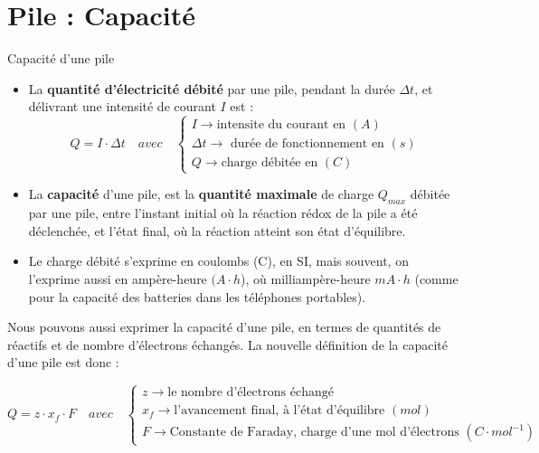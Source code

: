 \documentclass[11pt,a4paper]{article}
\begin{document}
\section{Pile : Capacité}

\begin{defn}{Capacité d'une pile}
\begin{itemize}
    \item La \textbf{quantité d'électricité débité} par une pile, pendant la durée $\Delta t$, et délivrant une intensité de courant $I$ est : 
    $$ Q = I\cdot \Delta t  \quad avec \quad \begin{cases}
    I \rightarrow  \text{intensite du courant en }(A) \\
    \Delta t \rightarrow \text{ durée de fonctionnement en }(s) \\ 
    Q \rightarrow  \text{charge débitée en }(C)
     \end{cases}$$
    \item La \textbf{capacité} d'une pile, est la \textbf{quantité maximale} de charge $Q_{max}$ débitée par une pile, entre l'instant initial où la réaction rédox de la pile a été déclenchée, et l'état final, où la réaction atteint son état d'équilibre. 
    \item Le charge débité s'exprime en coulombs (C), en SI, mais souvent, on l'exprime aussi en ampère-heure $(A\cdot h$), où milliampère-heure $mA\cdot h$ (comme pour la capacité des batteries dans les téléphones portables). 
\end{itemize}
\end{defn}

Nous pouvons aussi exprimer la capacité d'une pile, en termes de quantités de réactifs et de nombre d'électrons échangés. La nouvelle définition de la capacité d'une pile est donc : 

\begin{shaded}
$$ Q = z\cdot x_f\cdot F  \quad avec \quad \begin{cases}
    z \rightarrow  \text{le nombre d'électrons échangé } \\
    x_f \rightarrow \text{l'avancement final, à l'état d'équilibre }(mol) \\ 
    F \rightarrow  \text{Constante de Faraday, charge d'une mol d'électrons }(C\cdot mol^{-1})
     \end{cases}$$
\end{shaded}
\end{document}
